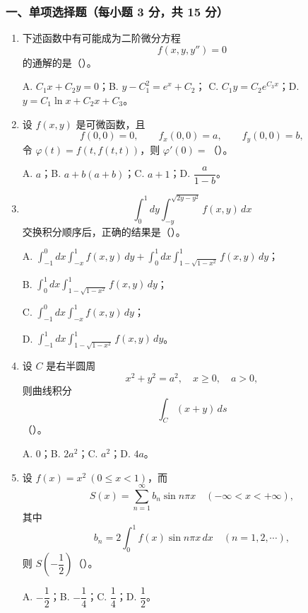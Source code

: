 \subsubsection*{一、单项选择题（每小题 3 分，共 15 分）}
\begin{enumerate}
  \item 下述函数中有可能成为二阶微分方程
  \[
  f(x,y,y'')=0
  \]
  的通解的是（\quad）。

  A. $C_1x+C_2y=0$；\quad B. $y-C_1^2=e^x+C_2$；\quad
  C. $C_1y=C_2e^{C_3x}$；\quad D. $y=C_1\ln x+C_2x+C_3$。

  \item 设 $f(x,y)$ 是可微函数，且
  \[
  f(0,0)=0,\qquad f_x(0,0)=a,\qquad f_y(0,0)=b,
  \]
  令 $\varphi(t)=f(t,f(t,t))$，则 $\varphi'(0)=$（\quad）。

  A. $a$；\quad B. $a+b(a+b)$；\quad C. $a+1$；\quad D. $\dfrac{a}{1-b}$。

  \item
  \[
  \int_0^1dy\int_{-y}^{\sqrt{2y-y^2}} f(x,y)\,dx
  \]
  交换积分顺序后，正确的结果是（\quad）。

  A. $\displaystyle \int_{-1}^0dx\int_{-x}^1f(x,y)\,dy+\int_0^1dx\int_{1-\sqrt{1-x^2}}^1f(x,y)\,dy$；

  B. $\displaystyle \int_0^1dx\int_{1-\sqrt{1-x^2}}^1f(x,y)\,dy$；

  C. $\displaystyle \int_{-1}^0dx\int_{-x}^1f(x,y)\,dy$；

  D. $\displaystyle \int_{-1}^1dx\int_{1-\sqrt{1-x^2}}^1f(x,y)\,dy$。

  \item 设 $C$ 是右半圆周
  \[
  x^2+y^2=a^2,\quad x\ge0,\quad a>0,
  \]
  则曲线积分
  \[
  \int_C(x+y)\,ds
  \]
  （\quad）。

  A. $0$；\quad B. $2a^2$；\quad C. $a^2$；\quad D. $4a$。

  \item 设 $f(x)=x^2\ (0\le x<1)$，而
  \[
  S(x)=\sum_{n=1}^{\infty}b_n\sin n\pi x\quad(-\infty<x<+\infty),
  \]
  其中
  \[
  b_n=2\int_0^1f(x)\sin n\pi x\,dx\quad(n=1,2,\cdots),
  \]
  则 $S\!\left(-\dfrac12\right)$（\quad）。

  A. $-\dfrac12$；\quad B. $-\dfrac14$；\quad C. $\dfrac14$；\quad D. $\dfrac12$。
\end{enumerate}

